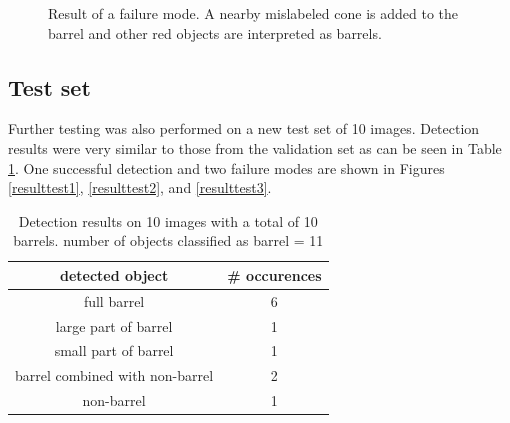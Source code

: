 \documentclass[letterpaper, 10 pt, conference]{ieeeconf}  %
\begin{document}
   
   \begin{figure}[thpb]
      \centering
      
      \caption{Result of a failure mode. A nearby mislabeled cone is added to the barrel and other red objects are interpreted as barrels.}
      \label{resultfig-fail}
   \end{figure}

\subsection{Test set}
Further testing was also performed on a new test set of 10 images. Detection results were very similar to those from the validation set as can be seen in Table \ref{resultstest}. One successful detection and two failure modes are shown in Figures \ref{resulttest1}, \ref{resulttest2}, and \ref{resulttest3}.
  
\begin{table}[h]
\caption{Detection results on 10 images with a total of 10 barrels. number of objects classified as barrel = 11}
\label{resultstest}
\begin{center}
\begin{tabular}{|c|c|}
\hline
detected object & \# occurences\\
\hline
full barrel & 6\\
\hline
large part of barrel & 1\\
\hline
small part of barrel & 1\\
\hline
barrel combined with non-barrel & 2\\
\hline
non-barrel & 1\\
\hline
\end{tabular}
\end{center}
\end{table}
\end{document}
